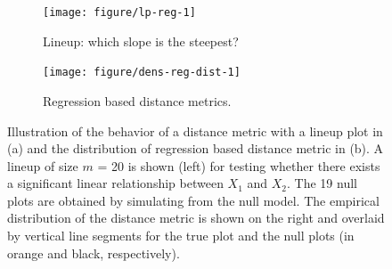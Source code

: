 \documentclass[12pt]{article}\usepackage[]{graphicx}\usepackage[]{color}
\newenvironment{knitrout}{}{} %
\newcommand{\hh}[1]{{\color{magenta} #1}}
\begin{document}
\begin{figure}[!p]
\centering
\begin{subfigure}[b]{0.55\textwidth}
\caption{\label{dist_1}Lineup: which slope is the steepest?}
\begin{knitrout}
\color{fgcolor}
\texttt{[image: figure/lp-reg-1]} 

\end{knitrout}
\end{subfigure}
\begin{subfigure}[b]{0.44\textwidth}
\caption{\label{dist_2}Regression based distance metrics.
}




\begin{knitrout}
\color{fgcolor}
\texttt{[image: figure/dens-reg-dist-1]} 

\end{knitrout}
\end{subfigure}
\label{dist}
	\vspace{-.1in}
\caption{
\label{fig:distances}Illustration of the behavior of a distance metric with a lineup plot in (a) and the distribution of regression based distance metric in (b). A lineup of size $m$ = 20 is shown (left) for testing whether there exists a significant linear relationship between $X_1$ and $X_2$. The 19 null plots are obtained by simulating from the null model.  The empirical distribution of the distance metric is shown on the right and overlaid by vertical line segments for the true plot and the null plots (in orange and black, respectively).  }
\end{figure}
\end{document}
